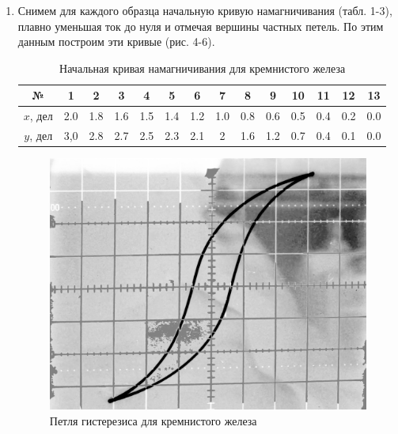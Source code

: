 \documentclass[12pt]{kiarticle} %
\begin{document}
\begin{enumerate}
\begin{itemize}
  
  	
 	 \end{itemize}

  	
  	
  	\item Снимем для каждого образца начальную кривую намагничивания (табл. 1-3), плавно уменьшая ток до нуля и отмечая вершины частных петель. По этим данным построим эти кривые (рис. 4-6).
  	
  		\begin{table}[h!]
  		\caption{Начальная кривая намагничивания для кремнистого железа}
  		\begin{center}
  			\begin{tabular}{|c|c|c|c|c|c|c|c|c|c|c|c|c|c|} 
  				\hline 
  				№ &  1 &  2 & 3 & 4 & 5 &  6 &  7 & 8 & 9 & 10  &  11 &  12 & 13  \\ 	\hline
  				
  			 $ x $, дел & 2.0 & 1.8 & 1.6 & 1.5 & 1.4 & 1.2 & 1.0 & 0.8 & 0.6 & 0.5 & 0.4 & 0.2 & 0.0 \\
  				 $ y $, дел & 3,0 & 2.8 & 2.7 & 2.5 & 2.3 & 2.1 & 2 & 1.6 & 1.2 & 0.7 & 0.4 & 0.1 & 0.0 \\
  				\hline
  				
  			\end{tabular}
  		\end{center}
  	\end{table}
  	
  	\begin{figure}[h!]
  		\includegraphics[scale=0.22]{1.png}
  		\caption{Петля гистерезиса для кремнистого железа}
  	\end{figure}
  



\end{enumerate}
\end{document}
